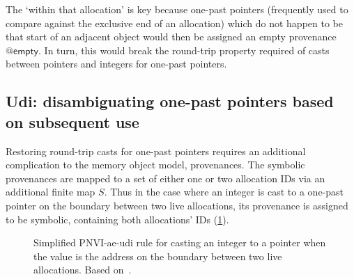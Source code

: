 The `within that allocation' is key because one-past pointers (frequently used
to compare against the exclusive end of an allocation) which do not happen to
be that start of an adjacent object would then be assigned an empty provenance
$\mathsf{@empty}$. In turn, this would break the round-trip property required
of casts between pointers and integers for one-past pointers.

\subsection{Udi: disambiguating one-past pointers based on subsequent use}

Restoring round-trip casts for one-past pointers requires an additional
complication to the memory object model,  provenances. The
symbolic provenances are mapped to a set of either one or two allocation IDs
via an additional finite map $\mathit{S}$. Thus in the case where an integer
is cast to a one-past pointer on the boundary between two live allocations, its
provenance is assigned to be symbolic, containing both allocations' IDs
(\cref{fig:pnvi-ival-to-pval-symbolic}).

\begin{figure}
\begin{mathpar}
\end{mathpar}\caption{Simplified PNVI-ae-udi rule for casting an integer to a
    pointer when the value is the address on the boundary between two live
    allocations. Based
    on~\textcite{memarian2022cerberus}.}\label{fig:pnvi-ival-to-pval-symbolic}
\end{figure}

